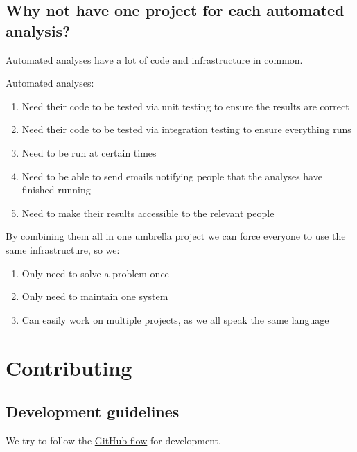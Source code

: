 \documentclass[12pt,]{article}
\providecommand{\tightlist}{%
  \setlength{\itemsep}{0pt}\setlength{\parskip}{0pt}}
\theoremstyle{definition}
\theoremstyle{definition}
\theoremstyle{definition}
\theoremstyle{remark}
\begin{document}
\subsection{Why not have one project for each automated
analysis?}\label{why-not-have-one-project-for-each-automated-analysis-1}

Automated analyses have a lot of code and infrastructure in common.

Automated analyses:

\begin{enumerate}
\def\labelenumi{\arabic{enumi}.}
\tightlist
\item
  Need their code to be tested via unit testing to ensure the results
  are correct
\item
  Need their code to be tested via integration testing to ensure
  everything runs
\item
  Need to be run at certain times
\item
  Need to be able to send emails notifying people that the analyses have
  finished running
\item
  Need to make their results accessible to the relevant people
\end{enumerate}

By combining them all in one umbrella project we can force everyone to
use the same infrastructure, so we:

\begin{enumerate}
\def\labelenumi{\arabic{enumi}.}
\tightlist
\item
  Only need to solve a problem once
\item
  Only need to maintain one system
\item
  Can easily work on multiple projects, as we all speak the same
  language
\end{enumerate}

\section{Contributing}\label{contributing}

\subsection{Development guidelines}\label{development-guidelines}

We try to follow the
\href{https://guides.github.com/introduction/flow/}{GitHub flow} for
development.
\end{document}
